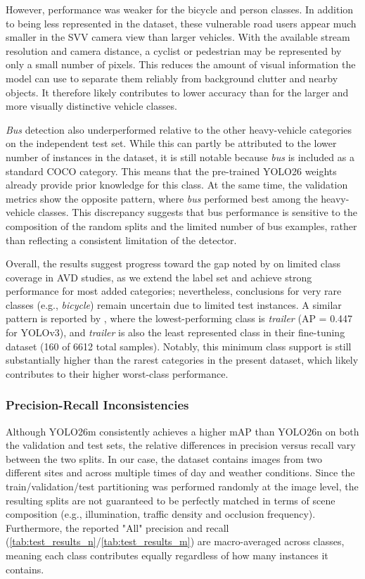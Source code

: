 However, performance was weaker for the bicycle and person classes. In addition to being less represented in the dataset, these vulnerable road users appear much smaller in the SVV camera view than larger vehicles. With the available stream resolution and camera distance, a cyclist or pedestrian may be represented by only a small number of pixels. This reduces the amount of visual information the model can use to separate them reliably from background clutter and nearby objects. It therefore likely contributes to lower accuracy than for the larger and more visually distinctive vehicle classes.

\textit{Bus} detection also underperformed relative to the other heavy-vehicle categories on the independent test set. While this can partly be attributed to the lower number of instances in the dataset, it is still notable because \textit{bus} is included as a standard COCO category. This means that the pre-trained YOLO26 weights already provide prior knowledge for this class. At the same time, the validation metrics show the opposite pattern, where \textit{bus} performed best among the heavy-vehicle classes. This discrepancy suggests that bus performance is sensitive to the composition of the random splits and the limited number of bus examples, rather than reflecting a consistent limitation of the detector.

Overall, the results suggest progress toward the gap noted by \citet{Maity2022LastDecadeVehicleDetection} on limited class coverage in AVD studies, as we extend the label set and achieve strong performance for most added categories; nevertheless, conclusions for very rare classes (e.g., \textit{bicycle}) remain uncertain due to limited test instances. A similar pattern is reported by \citet{Neupane2022RealTimeVehicle}, where the lowest-performing class is \textit{trailer} (AP = 0.447 for YOLOv3), and \textit{trailer} is also the least represented class in their fine-tuning dataset (160 of 6612 total samples). Notably, this minimum class support is still substantially higher than the rarest categories in the present dataset, which likely contributes to their higher worst-class performance.

\subsubsection{Precision-Recall Inconsistencies}
Although YOLO26m consistently achieves a higher mAP than YOLO26n on both the validation and test sets, the relative differences in precision versus recall vary between the two splits. In our case, the dataset contains images from two different sites and across multiple times of day and weather conditions. Since the train/validation/test partitioning was performed randomly at the image level, the resulting splits are not guaranteed to be perfectly matched in terms of scene composition (e.g., illumination, traffic density and occlusion frequency). Furthermore, the reported "All" precision and recall (\autoref{tab:test_results_n}/\ref{tab:test_results_m}) are macro-averaged across classes, meaning each class contributes equally regardless of how many instances it contains.

